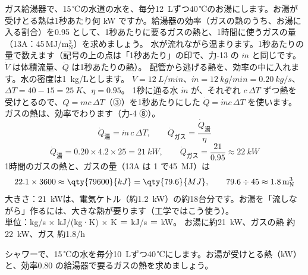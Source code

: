 \label{ph:熱-1:ex11}
\begin{phreidai}[ガス給湯器の能力]
ガス給湯器で、15\,℃の水道の水を、毎分\qty{12}{L}ずつ40\,℃のお湯にします。お湯が受けとる熱は1秒あたり何 kW ですか。給湯器の効率（ガスの熱のうち、お湯に入る割合）を0.95 として、1秒あたりに要るガスの熱と、1時間に使うガスの量（13A：45\,MJ/m$^3_{\mathrm N}$）を求めましょう。
\phbamen
水が流れながら温まります。1秒あたりの量で数えます（記号の上の点は「1秒あたり」の印で、力-13 の $\dot m$ と同じです。$\dot V$ は体積流量、$\dot Q$ は1秒あたりの熱）。
\phmushi
配管から逃げる熱を、効率の中に入れます。水の密度は\qty{1}{kg/L}とします。
\phzu
$\dot V=\qty{12}{L/min}$、$\dot m=\qty{12}{kg/min}=\qty{0.20}{kg/s}$、$\Delta T=40-15=\qty{25}{K}$、$\eta=0.95$。
\phriyu
1秒に通る水 $\dot m$ が、それぞれ $c\,\Delta T$ ずつ熱を受けとるので、$Q=mc\,\Delta T$（③）を1秒あたりにした $\dot Q=\dot mc\,\Delta T$ を使います。ガスの熱は、効率でわります（力-4 ⑧）。
\phtateru
\[\dot Q_{\text{湯}}=\dot m\,c\,\Delta T,\qquad \dot Q_{\text{ガス}}=\frac{\dot Q_{\text{湯}}}{\eta}\]
\phtoku
\[\dot Q_{\text{湯}}=0.20\times4.2\times25=\qty{21}{kW},\qquad \dot Q_{\text{ガス}}=\frac{21}{0.95}\approx\qty{22}{kW}\]
1時間のガスの熱と、ガスの量（13A は 1\qxbmN{} で\qty{45}{MJ}）は
\[22.1\times3600\approx\qty{79600}{kJ}=\qty{79.6}{MJ},\qquad 79.6\div45\approx1.8\qxbmN{}\]
\phtashikame
大きさ：\qty{21}{kW}は、電気ケトル（約\qty{1.2}{kW}）の約18台分です。お湯を「流しながら」作るには、大きな熱が要ります（工学ではこう使う）。\\
単位：kg/s × kJ/(kg·K) × K ＝ kJ/s ＝ kW。
\kotae お湯に約\qty{21}{kW}、ガスの熱 約\qty{22}{kW}、ガス 約1.8\qxbmN{}/h
\end{phreidai}
\begin{jibun}
シャワーで、15\,℃の水を毎分\qty{10}{L}ずつ40\,℃にします。お湯が受けとる熱（kW）と、効率0.80 の給湯器で要るガスの熱を求めましょう。
\end{jibun}

